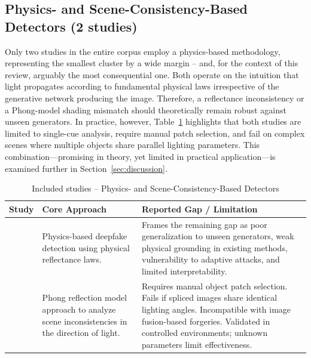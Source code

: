 \documentclass[sn-mathphys-num,Numbered,pdflatex]{sn-jnl}
\begin{document}
\subsection{Physics- and Scene-Consistency-Based Detectors (2 studies)}
Only two studies in the entire corpus employ a physics-based methodology, representing the smallest cluster by a wide margin -- and, for the context of this review, arguably the most consequential one. Both operate on the intuition that light propagates according to fundamental physical laws irrespective of the generative network producing the image. Therefore, a reflectance inconsistency \cite{Light2lieDetecting2} or a Phong-model shading mismatch \cite{DigitalImage42} should theoretically remain robust against unseen generators. In practice, however, Table~\ref{tab:physics_based} highlights that both studies are limited to single-cue analysis, require manual patch selection, and fail on complex scenes where multiple objects share parallel lighting parameters. This combination—promising in theory, yet limited in practical application—is examined further in Section~\ref{sec:discussion}.

\begin{table}[htbp]
\caption{Included studies -- Physics- and Scene-Consistency-Based Detectors}
\label{tab:physics_based}
\centering\footnotesize
\begin{tabularx}{\columnwidth}{@{}p{} X X@{}}
\toprule
\textbf{Study} & \textbf{Core Approach} & \textbf{Reported Gap / Limitation} \\
\midrule
\cite{Light2lieDetecting2} & Physics-based deepfake detection using physical reflectance laws. & Frames the remaining gap as poor generalization to unseen generators, weak physical grounding in existing methods, vulnerability to adaptive attacks, and limited interpretability. \\
\cite{DigitalImage42} & Phong reflection model approach to analyze scene inconsistencies in the direction of light. & Requires manual object patch selection. Fails if spliced images share identical lighting angles. Incompatible with image fusion-based forgeries. Validated in controlled environments; unknown parameters limit effectiveness. \\
\bottomrule
\end{tabularx}
\end{table}
\FloatBarrier
\end{document}

